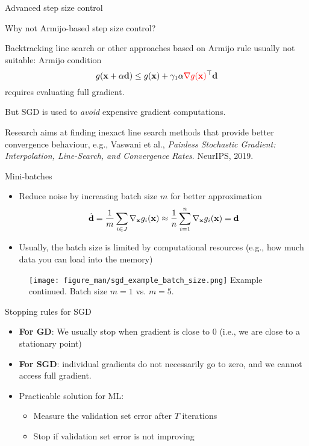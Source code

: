 \documentclass[11pt,compress,t,notes=noshow, xcolor=table]{beamer}
\begin{document}
\begin{vbframe}{Advanced step size control} 

\begin{blocki}{Why not Armijo-based step size control? }
    \item Backtracking line search or other approaches based on Armijo rule usually not suitable: Armijo condition 
    $$
          g(\mathbf{x} + \alpha \mathbf{d}) \le g(\mathbf{x}) + \gamma_1 \alpha \textcolor{red}{\nabla g(\mathbf{x})}^\top \mathbf{d}
    $$
    requires evaluating full gradient.
    \item But SGD is used to \emph{avoid} expensive gradient computations. 
    \item Research aims at finding inexact line search methods that provide better convergence behaviour, e.g., Vaswani et al., \emph{Painless Stochastic Gradient: Interpolation, Line-Search, and Convergence Rates}. NeurIPS, 2019.
\end{blocki}

\end{vbframe}


\begin{vbframe}{Mini-batches}

\begin{itemize}
	\item Reduce noise by increasing batch size $m$ for better approximation
	$$
		\hat{\mathbf{d}} = \frac{1}{m} \sum_{i \in J} \nabla_{\mathbf{x}} g_i(\mathbf{x}) \approx \frac{1}{n} \sum\limits_{i=1}^n \nabla_{\mathbf{x}} g_i(\mathbf{x}) = \mathbf{d} 
	$$
	\item Usually, the batch size is limited by computational resources (e.g., how much data you can load into the memory)
\end{itemize}

 	\begin{figure}
 		\vspace{-0.3cm}
 		\centering
 		\texttt{[image: figure\_man/sgd\_example\_batch\_size.png]} \newline
		Example continued. Batch size $m = 1$ vs. $m = 5$. 
 	\end{figure}

\end{vbframe}

\begin{vbframe}{Stopping rules for SGD} 

\begin{itemize}
	\item \textbf{For GD}: We usually stop when gradient is close to $0$ (i.e., we are close to a stationary point)
	\item \textbf{For SGD}: individual gradients do not necessarily go to zero, and we cannot access full gradient.
	\item Practicable solution for ML: 
	\begin{itemize}
		\item Measure the validation set error after $T$ iterations
		\item Stop if validation set error is not improving
	\end{itemize}
\end{itemize}


\end{vbframe}
\end{document}
